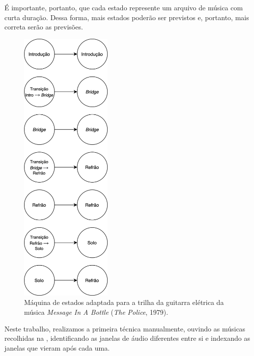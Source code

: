 É importante, portanto, que cada estado represente um arquivo de música com curta duração. Dessa forma, mais estados poderão ser previstos e, portanto, mais correta serão as previsões.

\begin{figure}[htbp]
    \centering
    \includegraphics[width=0.4\textwidth]{images/MIAB adapted state machine.png}
    \caption{Máquina de estados adaptada para a trilha da guitarra elétrica da música \textit{Message In A Bottle} (\textit{The Police}, 1979).}
    \label{fig:miab_adapted_state_machine}
\end{figure}


Neste trabalho, realizamos a primeira técnica manualmente, ouvindo as músicas recolhidas na , identificando as janelas de áudio diferentes entre si e indexando as janelas que vieram após cada uma. 